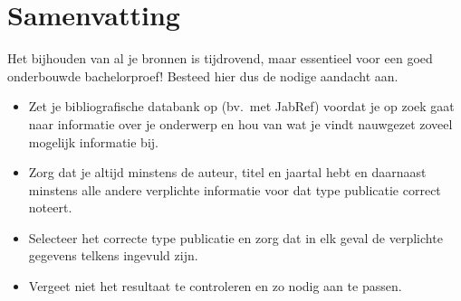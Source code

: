 \section{Samenvatting}%
\label{sec:bibliografie-samenvatting}

Het bijhouden van al je bronnen is tijdrovend, maar essentieel voor een goed onderbouwde bachelorproef! Besteed hier dus de nodige aandacht aan.

\begin{itemize}
  \item Zet je bibliografische databank op (bv.\ met JabRef) voordat je op zoek gaat naar informatie over je onderwerp en hou van wat je vindt nauwgezet zoveel mogelijk informatie bij.
  \item Zorg dat je altijd minstens de auteur, titel en jaartal hebt en daarnaast minstens alle andere verplichte informatie voor dat type publicatie correct noteert.
  \item Selecteer het correcte type publicatie en zorg dat in elk geval de verplichte gegevens telkens ingevuld zijn.
  \item Vergeet niet het resultaat te controleren en zo nodig aan te passen.
\end{itemize}
